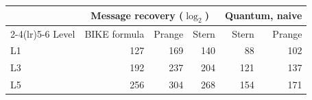 \begin{tabular}{lrrrrr}
\toprule
 & \multicolumn{3}{c}{Message recovery ($\log_2$)} & \multicolumn{2}{c}{Quantum, naive}\\
\cmidrule(lr){2-4}\cmidrule(lr){5-6}
Level & BIKE formula & Prange & Stern & Stern & Prange\\
\midrule
L1 & 127 & 169 & 140 & 88 & 102\\
L3 & 192 & 237 & 204 & 121 & 137\\
L5 & 256 & 304 & 268 & 154 & 171\\
\bottomrule
\end{tabular}
